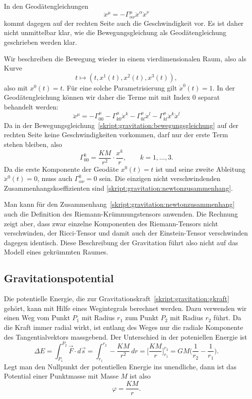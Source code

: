 In den Geodätengleichungen 
\[
\ddot x^\mu = -\Gamma^\mu_{\alpha\nu}\dot x^\alpha\dot x^\nu
\]
kommt dagegen auf der rechten Seite auch die Geschwindigkeit vor.
Es ist daher nicht unmittelbar klar, wie die Bewegungsgleichung als
Geodätengleichung geschrieben werden klar.

Wir beschreiben die Bewegung wieder in einem vierdimensionalen Raum,
also als Kurve
\[
t\mapsto (t,x^1(t),x^2(t),x^3(t)),
\]
also mit $x^0(t)=t$.
Für eine solche Parametrisierung gilt $\dot x^0(t)=1$.
In der Geodätengleichung können wir daher die Terme mit mit Index $0$
separat behandelt werden:
\[
\ddot x^\mu
=
-\Gamma^\mu_{00}
-\Gamma^\mu_{k0}\dot x^k -\Gamma^\mu_{0l}\dot x^l
- \Gamma^\mu_{kl}\dot x^k\dot x^l
\]
Da in der Bewegungsgleichung~\eqref{skript:gravitation:bewegungsgleichung}
auf der rechten Seite keine Geschwindigkeiten vorkommen, darf nur der
erste Term stehen bleiben, also
\begin{equation}
\Gamma^k_{00} = \frac{KM}{r^2}\cdot \frac{x^k}{r},\qquad k=1,\dots,3.
\label{skript:gravitation:newtonzusammenhang}
\end{equation}
Da die erste Komponente der Geodäte $x^0(t)=t$ ist und seine zweite
Ableitung $\ddot x^0(t)=0$, muss auch $\Gamma^0_{\alpha\nu}=0$ sein.
Die einzigen nicht verschwindenden Zusammenhangskoeffizienten sind
\eqref{skript:gravitation:newtonzusammenhang}.

Man kann für den Zusammenhang~\eqref{skript:gravitation:newtonzusammenhang}
auch die Definition des Riemann-Krümmungstensors anwenden.
Die Rechnung zeigt aber, dass zwar einzelne Komponenten des Riemann-Tensors
nicht verschwinden, der Ricci-Tensor und damit auch der Einstein-Tensor
verschwinden dagegen identisch.
Diese Beschreibung der Gravitation führt also nicht auf das Modell
eines gekrümmten Raumes.

\subsection{Gravitationspotential}
Die potentielle Energie, die zur
Gravitationskraft~\eqref{skript:gravitation:gkraft} gehört, kann
mit Hilfe eines Wegintegrals berechnet werden.
Dazu verwenden wir einen Weg vom Punkt $P_1$ mit Radius $r_1$
zum Punkt $P_2$ mit Radius $r_2$ führt.
Da die Kraft immer radial wirkt, ist entlang des Weges nur die radiale
Komponente des Tangentialvektors massgebend.
Der Unterschied in der poteniellen Energie ist
\[
\Delta E
=
\int_{P_1}^{P_2} \vec F\cdot d\vec s
=
\int_{r_1}^{r_2} -\frac{KM}{r^2}\,dr
=
\biggl[
\frac{KM}{r}
\biggr]_{r_1}^{r_2}
=
GM\biggl(\frac{1}{r_2}-\frac{1}{r_1}\biggr).
\]
Legt man den Nullpunkt der potentiellen Energie ins unendliche, dann ist
das Potential einer Punktmasse mit Masse $M$ ist also
\begin{equation}
\varphi = \frac{KM}{r}.
\label{skript:gravitation:potential}
\end{equation}

